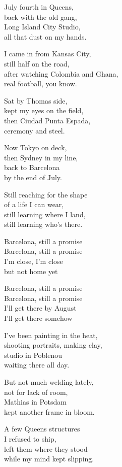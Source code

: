 \begin{lyrics}
July fourth in Queens,\\
back with the old gang,\\
Long Island City Studio,\\
all that dust on my hands.

I came in from Kansas City,\\
still half on the road,\\
after watching Colombia and Ghana,\\
real football, you know.

Sat by Thomas side,\\
kept my eyes on the field,\\
then Ciudad Punta Espada,\\
ceremony and steel.

Now Tokyo on deck,\\
then Sydney in my line,\\
back to Barcelona\\
by the end of July.

Still reaching for the shape\\
of a life I can wear,\\
still learning where I land,\\
still learning who’s there.

Barcelona, still a promise\\
Barcelona, still a promise\\
I’m close, I’m close\\
but not home yet

Barcelona, still a promise\\
Barcelona, still a promise\\
I’ll get there by August\\
I’ll get there somehow

I’ve been painting in the heat,\\
shooting portraits, making clay,\\
studio in Poblenou\\
waiting there all day.

But not much welding lately,\\
not for lack of room,\\
Mathias in Potsdam\\
kept another frame in bloom.

A few Queens structures\\
I refused to ship,\\
left them where they stood\\
while my mind kept slipping.


\end{lyrics}
